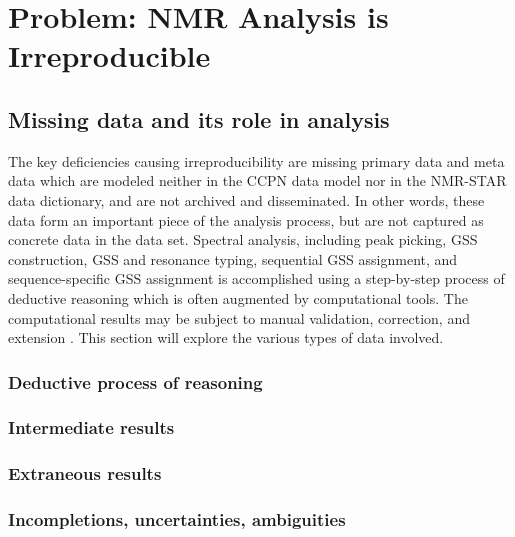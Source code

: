 \chapter{Problem: NMR Analysis is Irreproducible}

\section{Missing data and its role in analysis}
The key deficiencies causing irreproducibility are missing primary data and 
meta data which are modeled neither in the CCPN data model nor in the 
NMR-STAR data dictionary, and are not archived and disseminated.
In other words, these data form an important piece of the analysis process,
but are not captured as concrete data in the data set.
Spectral analysis, including peak picking, GSS construction, GSS and resonance
typing, sequential GSS assignment, and sequence-specific GSS assignment is 
accomplished using a step-by-step process of deductive reasoning 
which is often augmented by computational tools.  The computational 
results may be subject to manual validation, correction, and extension
\cite{guerry2011automated}.  This section will explore the various types
of data involved.


\subsection*{Deductive process of reasoning}

\subsection*{Intermediate results}

\subsection*{Extraneous results}

\subsection*{Incompletions, uncertainties, ambiguities}



